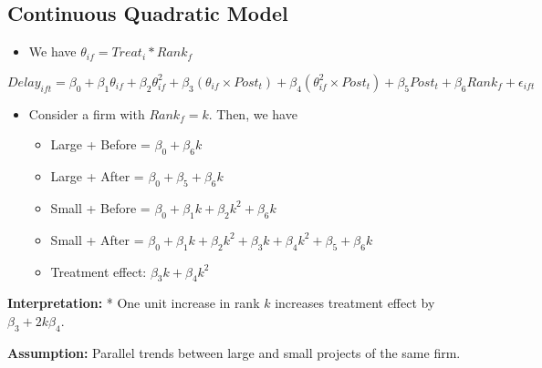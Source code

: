 \documentclass[]{article}
\providecommand{\tightlist}{%
  \setlength{\itemsep}{0pt}\setlength{\parskip}{0pt}}
\begin{document}
\hypertarget{continuous-quadratic-model}{%
\subsection{Continuous Quadratic
Model}\label{continuous-quadratic-model}}

\begin{itemize}
\tightlist
\item
  We have \(\theta_{if} = Treat_i * Rank_f\)
\end{itemize}

\[ Delay_{ift} = \beta_0 + \beta_1 \theta_{if} + \beta_2 \theta_{if}^2 + \beta_3 (\theta_{if} \times Post_t) + \beta_4 (\theta_{if}^2 \times Post_t)+ \beta_5 Post_t + \beta_6 Rank_f + \epsilon_{ift} \]

\begin{itemize}
\tightlist
\item
  Consider a firm with \(Rank_f = k\). Then, we have

  \begin{itemize}
  \tightlist
  \item
    Large + Before = \(\beta_0 + \beta_6 k\)
  \item
    Large + After = \(\beta_0+\beta_5 +\beta_6 k\)
  \item
    Small + Before = \(\beta_0+\beta_1 k + \beta_2 k^2 + \beta_6 k\)
  \item
    Small + After =
    \(\beta_0+\beta_1 k + \beta_2 k^2 + \beta_3 k + \beta_4 k^2 + \beta_5 + \beta_6 k\)
  \item
    Treatment effect: \(\beta_3 k + \beta_4 k^2\)
  \end{itemize}
\end{itemize}

\textbf{Interpretation:} * One unit increase in rank \(k\) increases
treatment effect by \(\beta_3 + 2k \beta_4\).

\textbf{Assumption:} Parallel trends between large and small projects of
the same firm.
\end{document}
